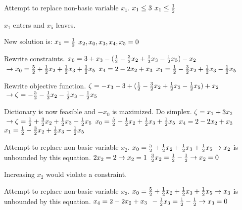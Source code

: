 \documentclass[17pt]{extarticle}
\begin{document}
\bigskip Attempt to replace non-basic variable $x_1$.
$\\ x_1 \leq 3$
$\\ x_1 \leq \frac{1}{2}$

\bigskip $x_1$ enters and $x_5$ leaves.

\bigskip New solution is:
$\\x_1 = \frac{1}{2}$
$\\x_2, x_0, x_3, x_4, x_5 = 0$

\bigskip Rewrite constraints.
$\\ x_0 = 3 + x_3 - (\frac{1}{2} - \frac{3}{2}x_2 + \frac{1}{2}x_3 - \frac{1}{2}x_5) - x_2$
$\\\to x_0 = \frac{5}{2} + \frac{1}{2}x_2 + \frac{1}{2}x_3 + \frac{1}{2}x_5$
$\\ x_4 = 2 - 2x_2 + x_3$
$\\ x_1 = \frac{1}{2} - \frac{3}{2}x_2 + \frac{1}{2}x_3 - \frac{1}{2}x_5$

\bigskip Rewrite objective function.
$\\\zeta = -x_3 - 3 + (\frac{1}{2} - \frac{3}{2}x_2 + \frac{1}{2}x_3 - \frac{1}{2}x_5) + x_2$
$\\\to \zeta = - \frac{5}{2} - \frac{1}{2}x_2 - \frac{1}{2}x_3 - \frac{1}{2}x_5$

\bigskip Dictionary is now feasible and $-x_0$ is maximized. Do simplex.
$\\\zeta = x_1 + 3x_2$
$\\\to \zeta = \frac{1}{2} + \frac{3}{2}x_2 + \frac{1}{2}x_3 - \frac{1}{2}x_5$
$\\ x_0 = \frac{5}{2} + \frac{1}{2}x_2 + \frac{1}{2}x_3 + \frac{1}{2}x_5$
$\\ x_4 = 2 - 2x_2 + x_3$
$\\ x_1 = \frac{1}{2} - \frac{3}{2}x_2 + \frac{1}{2}x_3 - \frac{1}{2}x_5$

\bigskip Attempt to replace non-basic variable $x_2$.
$\\ x_0 = \frac{5}{2} + \frac{1}{2}x_2 + \frac{1}{2}x_3 + \frac{1}{2}x_5 \to x_2$ is unbounded by this equation. 
$\\ 2x_2 = 2 \to x_2 = 1$
$\\ \frac{3}{2}x_2 = \frac{1}{2} - \frac{1}{2} \to x_2 = 0$

\bigskip Increasing $x_2$ would violate a constraint.

\bigskip Attempt to replace non-basic variable $x_3$.
$\\ x_0 = \frac{5}{2} + \frac{1}{2}x_2 + \frac{1}{2}x_3 + \frac{1}{2}x_5 \to x_3$ is unbounded by this equation.
$\\ x_4 = 2 - 2x_2 + x_3$
$\\ -\frac{1}{2}x_3 = \frac{1}{2} - \frac{1}{2} \to x_3 = 0$
\end{document}
